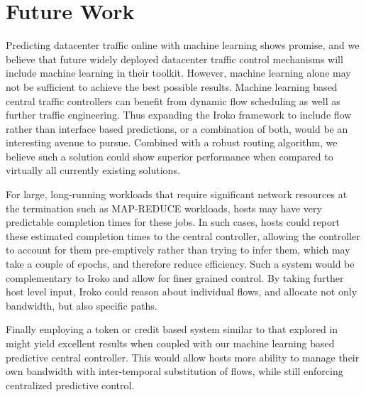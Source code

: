 \section{Future Work}
\label{sec:future}

Predicting datacenter traffic online with machine learning shows promise, and we believe that 
future widely deployed datacenter traffic control mechanisms will include
machine learning in their toolkit. However, machine learning alone may not
be sufficient to achieve the best possible results. Machine learning
based central traffic controllers can benefit from dynamic flow
scheduling as well as further traffic engineering. Thus expanding
the Iroko framework to include flow rather than interface based 
predictions, or a combination of both, would be an interesting 
avenue to pursue. Combined with a robust routing algorithm, we
believe such a solution could show superior performance when
compared to virtually all currently existing solutions.

For large, long-running workloads that require significant 
network resources at the termination such as MAP-REDUCE
workloads, hosts may have very predictable completion times
for these jobs. In such cases, hosts could report these 
estimated completion times to the central controller,
allowing the controller to account for them pre-emptively
rather than trying to infer them, which may take a couple
of epochs, and therefore reduce efficiency. Such a
system would be complementary to Iroko and
allow for finer grained control. By taking further
host level input, Iroko could reason about individual 
flows, and allocate not only bandwidth, but also 
specific paths.

Finally employing a token or credit based system similar
to that explored in \cite{expresspass} might yield excellent
results when coupled with our machine learning based predictive
central controller. This would allow hosts more ability to manage
their own bandwidth with inter-temporal substitution of flows,
while still enforcing centralized predictive control.


